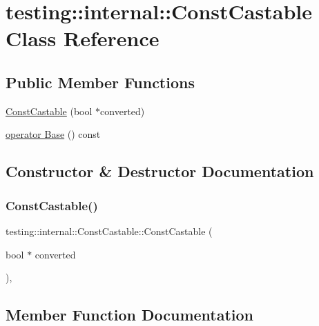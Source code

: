 \hypertarget{classtesting_1_1internal_1_1_const_castable}{}\section{testing\+:\+:internal\+:\+:Const\+Castable Class Reference}
\label{classtesting_1_1internal_1_1_const_castable}
\subsection*{Public Member Functions}
\begin{DoxyCompactItemize}
\item 
\hyperlink{classtesting_1_1internal_1_1_const_castable_a78eba470cc71528237a33a10a92fba7e}{Const\+Castable} (bool $\ast$converted)
\item 
\hyperlink{classtesting_1_1internal_1_1_const_castable_af084893d6786010022297b1e88f4743b}{operator Base} () const
\end{DoxyCompactItemize}


\subsection{Constructor \& Destructor Documentation}
\mbox{\label{classtesting_1_1internal_1_1_const_castable_a78eba470cc71528237a33a10a92fba7e}} 
\subsubsection{\texorpdfstring{Const\+Castable()}{ConstCastable()}}
{\footnotesize\ttfamily testing\+::internal\+::\+Const\+Castable\+::\+Const\+Castable (\begin{DoxyParamCaption}\item[{bool $\ast$}]{converted }\end{DoxyParamCaption})\hspace{0.3cm}{\ttfamily [inline]}, {\ttfamily [explicit]}}



\subsection{Member Function Documentation}
\mbox{\label{classtesting_1_1internal_1_1_const_castable_af084893d6786010022297b1e88f4743b}} 
